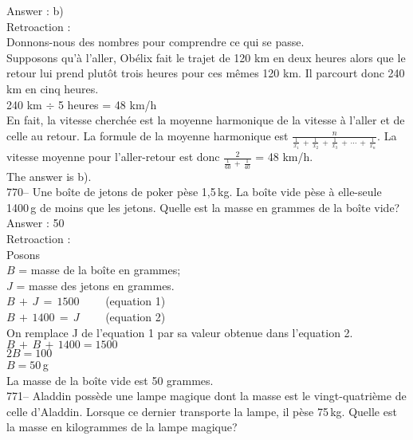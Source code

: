 ﻿\documentclass[letterpaper, 12pt]{article}
\begin{document}
Answer : b)\\

Retroaction : \\
Donnons-nous des nombres pour comprendre ce qui se passe.  \\
Supposons qu'\`a l'aller, Ob\'elix fait le trajet de 120 km en deux heures
alors que le retour lui prend plut\^ot trois heures pour ces m\^emes 120 km.
Il parcourt donc 240 km en cinq heures.  \\
240 km $\div$ 5 heures = 48 km/h\\

En fait, la vitesse cherch\'ee est la moyenne harmonique de la vitesse \`a
l'aller et de celle au retour.  La formule de la moyenne harmonique est
$\frac{n}{\frac{1}{x_1}\,+\,\frac{1}{x_2}\,+\,\frac{1}{x_3}\,+\,\cdots\,+\,\frac{1}{x_n}}$.
La vitesse moyenne pour l'aller-retour est donc
$\frac{2}{\frac{1}{60}\,+\,\frac{1}{40}}$ = 48 km/h.\\
The answer is b).\\

770-- Une bo\^ite de jetons de poker p\`ese 1,5\,kg.  La bo\^ite vide p\`ese
\`a elle-seule 1400\,g de moins que les jetons.  Quelle est la masse en
grammes de la bo\^ite vide?\\

Answer : 50\\

Retroaction : \\
Posons\\
$B$ = masse de la bo\^ite en grammes; \\
$J$ = masse des jetons en grammes. \\

$B\,+\,J\,=\,1500 \qquad$ (equation 1)\\
$B\,+\,1400\,=\,J \qquad$ (equation 2)\\

On remplace J de l'equation 1 par sa valeur obtenue dans l'equation 2.
\\
$B\,+\,B\,+\,1400=1500$\\
$2B=100$\\
$B=50$\,g\\
La masse de la bo\^ite vide est 50 grammes.\\

771-- Aladdin poss\`ede une lampe magique dont la masse est le
vingt-quatri\`eme de celle d'Aladdin.  Lorsque ce dernier transporte la
lampe, il p\`ese 75\,kg.  Quelle est la masse en kilogrammes de la lampe
magique?\\
\end{document}
